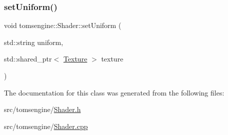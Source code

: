 \mbox{\label{classtomsengine_1_1_shader_a604bd6c3971d78104253a6ee04421cbd}} 
\subsubsection{\texorpdfstring{set\+Uniform()}{setUniform()}\hspace{0.1cm}{\footnotesize\ttfamily [4/4]}}
{\footnotesize\ttfamily void tomsengine\+::\+Shader\+::set\+Uniform (\begin{DoxyParamCaption}\item[{std\+::string}]{uniform,  }\item[{std\+::shared\+\_\+ptr$<$ \mbox{\hyperlink{classtomsengine_1_1_texture}{Texture}} $>$}]{texture }\end{DoxyParamCaption})}



The documentation for this class was generated from the following files\+:\begin{DoxyCompactItemize}
\item 
src/tomsengine/\mbox{\hyperlink{_shader_8h}{Shader.\+h}}\item 
src/tomsengine/\mbox{\hyperlink{_shader_8cpp}{Shader.\+cpp}}\end{DoxyCompactItemize}
